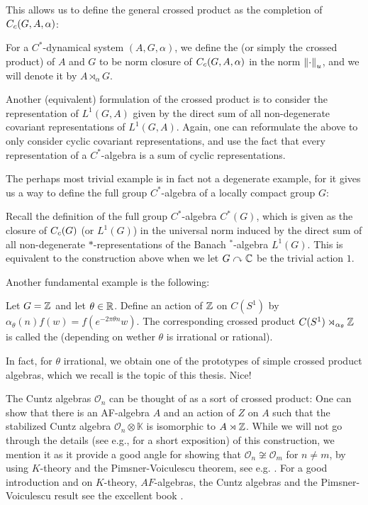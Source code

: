This allows us to define the general crossed product as the completion of $C_c(G,A,\alpha)$:
\begin{definition}
For a $C^*$-dynamical system $(A,G,\alpha)$, we define the  (or simply the crossed product) of $A$ and $G$ to be norm closure of $C_c(G,A,\alpha)$ in the norm $\left\lVert \cdot \right\rVert_u$, and we will denote it by $A \rtimes_\alpha G$.
\end{definition}
\begin{remark}
Another (equivalent) formulation of the crossed product is to consider the representation of $L^1(G,A)$ given by the direct sum of all non-degenerate covariant representations of $L^1(G,A)$. Again, one can reformulate the above to only consider cyclic covariant representations, and use the fact that every representation of a $C^*$-algebra is a sum of cyclic representations.
\end{remark}
The perhaps most trivial example is in fact not a degenerate example, for it gives us a way to define the full group $C^*$-algebra of a locally compact group $G$:
\begin{example}
	Recall the definition of the full group $C^*$-algebra $C^*(G)$, which is given as the closure of $C_c(G)$ (or $L^1(G)$) in the universal norm induced by the direct sum of all non-degenerate $*$-representations of the Banach $^*$-algebra $L^1(G)$. This is equivalent to the construction above when we let $G \stackrel{}{\curvearrowright} \mathbb{C}$ be the trivial action $1$. 
\end{example}
Another fundamental example is the following:
\begin{example}
Let $G = \mathbb{Z}$ and let $\theta \in \mathbb{R}$. Define an action of $\mathbb{Z}$ on $C(S^1)$ by $\alpha_\theta(n)f(w) = f(e^{-2\pi \theta n} w)$. The corresponding crossed product $C(S^1) \rtimes_{\alpha_\theta} \mathbb{Z}$ is called the  (depending on wether $\theta$ is irrational or rational).
\end{example}
In fact, for $\theta$ irrational, we obtain one of the prototypes of simple crossed product algebras, which we recall is the topic of this thesis. Nice!
\begin{example}
	The Cuntz algebras $\mathcal{O}_n$ can be thought of as a sort of crossed product: One can show that there is an AF-algebra $A$ and an action of $Z$ on $A$ such that the stabilized Cuntz algebra $\mathcal{O}_n \otimes \mathbb{K}$ is isomorphic to $A \rtimes \mathbb{Z}$. While we will not go through the details (see e.g., \cite[Example II.10.3.15]{blackadar} for a short exposition) of this construction, we mention it as it provide a good angle for showing that $\mathcal{O}_n \not \cong \mathcal{O}_m$ for $n \neq m$, by using $K$-theory and the Pimsner-Voiculescu theorem, see e.g. \cite[V.1.3.1 and V.1.3.3]{blackadar}. For a good introduction and on $K$-theory, $AF$-algebras, the Cuntz algebras and the Pimsner-Voiculescu result see the excellent book \cite{rordam2000introduction}.
\end{example}

